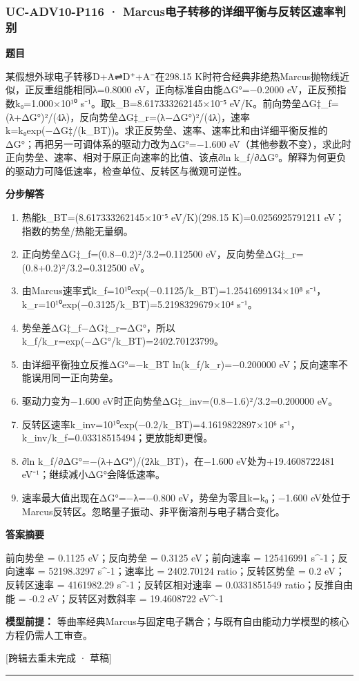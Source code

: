 \documentclass[UTF8,11pt,a4paper]{ctexart}
\begin{document}
\subsubsection*{UC-ADV10-P116 · Marcus电子转移的详细平衡与反转区速率判别}
\noindent\textbf{题目}\par
某假想外球电子转移D+A⇌D⁺+A⁻在298.15 K时符合经典非绝热Marcus抛物线近似，正反重组能相同λ=0.8000 eV，正向标准自由能ΔG°=−0.2000 eV，正反预指数k₀=1.000×10¹⁰ s⁻¹。取k\_B=8.617333262145×10⁻⁵ eV/K。前向势垒ΔG‡\_f=(λ+ΔG°)²/(4λ)，反向势垒ΔG‡\_r=(λ−ΔG°)²/(4λ)，速率k=k₀exp(−ΔG‡/(k\_BT))。求正反势垒、速率、速率比和由详细平衡反推的ΔG°；再把另一可调体系的驱动力改为ΔG°=−1.600 eV（其他参数不变），求此时正向势垒、速率、相对于原正向速率的比值、该点∂ln k\_f/∂ΔG°。解释为何更负的驱动力可降低速率，检查单位、反转区与微观可逆性。\par
\medskip\noindent\textbf{分步解答}
\begin{enumerate}
\item 热能k\_BT=(8.617333262145×10⁻⁵ eV/K)(298.15 K)=0.0256925791211 eV；指数的势垒/热能无量纲。
\item 正向势垒ΔG‡\_f=(0.8−0.2)²/3.2=0.112500 eV，反向势垒ΔG‡\_r=(0.8+0.2)²/3.2=0.312500 eV。
\item 由Marcus速率式k\_f=10¹⁰exp(−0.1125/k\_BT)=1.2541699134×10⁸ s⁻¹，k\_r=10¹⁰exp(−0.3125/k\_BT)=5.2198329679×10⁴ s⁻¹。
\item 势垒差ΔG‡\_f−ΔG‡\_r=ΔG°，所以k\_f/k\_r=exp(−ΔG°/k\_BT)=2402.70123799。
\item 由详细平衡独立反推ΔG°=−k\_BT ln(k\_f/k\_r)=−0.200000 eV；反向速率不能误用同一正向势垒。
\item 驱动力变为−1.600 eV时正向势垒ΔG‡\_inv=(0.8−1.6)²/3.2=0.200000 eV。
\item 反转区速率k\_inv=10¹⁰exp(−0.2/k\_BT)=4.1619822897×10⁶ s⁻¹，k\_inv/k\_f=0.03318515494；更放能却更慢。
\item ∂ln k\_f/∂ΔG°=−(λ+ΔG°)/(2λk\_BT)，在−1.600 eV处为+19.4608722481 eV⁻¹；继续减小ΔG°会降低速率。
\item 速率最大值出现在ΔG°=−λ=−0.800 eV，势垒为零且k=k₀；−1.600 eV处位于Marcus反转区。忽略量子振动、非平衡溶剂与电子耦合变化。
\end{enumerate}
\noindent\textbf{答案摘要}\par
前向势垒 = 0.1125 eV；反向势垒 = 0.3125 eV；前向速率 = 125416991 s\textasciicircum{}-1；反向速率 = 52198.3297 s\textasciicircum{}-1；速率比 = 2402.70124 ratio；反转区势垒 = 0.2 eV；反转区速率 = 4161982.29 s\textasciicircum{}-1；反转区相对速率 = 0.0331851549 ratio；反推自由能 = -0.2 eV；反转区对数斜率 = 19.4608722 eV\textasciicircum{}-1\par
\noindent\textbf{模型前提：}
等曲率经典Marcus与固定电子耦合；与既有自由能动力学模型的核心方程仍需人工审查。\par
\noindent\textcolor{red!65!black}{[跨辑去重未完成 · 草稿]} \par
\medskip\hrule\medskip
{}
\end{document}
